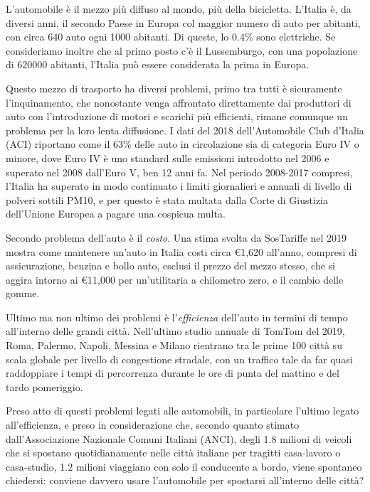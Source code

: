 L'automobile è il mezzo più diffuso al mondo, più della bicicletta. L'Italia è, da diversi anni, il secondo Paese in Europa col maggior numero di auto per abitanti, con circa 640 auto ogni 1000 abitanti\cite{eurostatcars}. Di queste, lo 0.4\% sono elettriche\cite{anfiastudiestatistiche}. Se consideriamo inoltre che al primo posto c'è il Lussemburgo, con una popolazione di 620000 abitanti, l'Italia può essere considerata la prima in Europa.

Questo mezzo di trasporto ha diversi problemi, primo tra tutti è sicuramente l'inquinamento, che nonostante venga affrontato direttamente dai produttori di auto con l'introduzione di motori e scarichi più efficienti, rimane comunque un problema per la loro lenta diffusione. I dati del 2018 dell'Automobile Club d'Italia (ACI) riportano come il 63\% delle auto in circolazione sia di categoria Euro IV o minore\cite{anfiastudiestatistiche}, dove Euro IV è uno standard sulle emissioni introdotto nel 2006 e superato nel 2008 dall'Euro V, ben 12 anni fa\cite{euroivstandard}. Nel periodo 2008-2017 compresi, l'Italia ha superato in modo continuato i limiti giornalieri e annuali di livello di polveri sottili PM10, e per questo è stata multata dalla Corte di Giustizia dell'Unione Europea a pagare una cospicua multa\cite{eunewssanzioneitalia}.

Secondo problema dell'auto è il \emph{costo}. Una stima svolta da SosTariffe nel 2019 mostra come mantenere un'auto in Italia costi circa €1,620 all'anno, compresi di assicurazione, benzina e bollo auto, esclusi il prezzo del mezzo stesso, che si aggira intorno ai €11,000 per un'utilitaria a chilometro zero, e il cambio delle gomme\cite{sostariffe}.

Ultimo ma non ultimo dei problemi è l'\emph{efficienza} dell'auto in termini di tempo all'interno delle grandi città. Nell'ultimo studio annuale di TomTom del 2019\cite{tomtomindexmilan}, Roma, Palermo, Napoli, Messina e Milano rientrano tra le prime 100 città su scala globale per livello di congestione stradale, con un traffico tale da far quasi raddoppiare i tempi di percorrenza durante le ore di punta del mattino e del tardo pomeriggio.

Preso atto di questi problemi legati alle automobili, in particolare l'ultimo legato all'efficienza, e preso in considerazione che, secondo quanto stimato dall'Associazione Nazionale Comuni Italiani (ANCI), degli 1.8 milioni di veicoli che si spostano quotidianamente nelle città italiane per tragitti casa-lavoro o casa-studio, 1.2 milioni viaggiano con solo il conducente a bordo\cite{anciperrepubblica}, viene spontaneo chiedersi: conviene davvero usare l'automobile per spostarsi all'interno delle città?